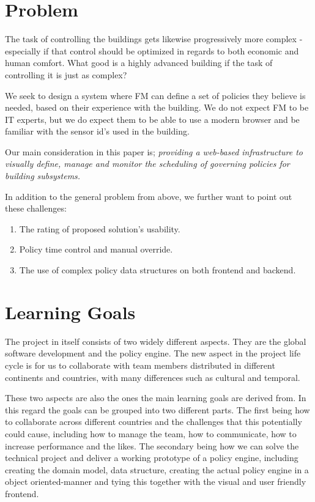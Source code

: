 \section{Problem} \label{sec:problem}
The task of controlling the buildings gets likewise progressively more complex - especially if that control should be optimized in regards to both economic and human comfort. What good is a highly advanced building if the task of controlling it is just as complex?

We seek to design a system where FM can define a set of policies they believe is needed, based on their experience with the building. We do not expect FM to be IT experts, but we do expect them to be able to use a modern browser and be familiar with the sensor id's used in the building.

Our main consideration in this paper is; \textit{providing a web-based infrastructure to visually define, manage and monitor the scheduling of governing policies for building subsystems.}

In addition to the general problem from above, we further want to point out these challenges:
\begin{enumerate}
	\item The rating of proposed solution's usability.
	\item Policy time control and manual override.
	\item The use of complex policy data structures on both frontend and backend.
\end{enumerate}

\section{Learning Goals} \label{sec:learninggoals}
The project in itself consists of two widely different aspects. They are the global software development and the policy engine. The new aspect in the project life cycle is for us to collaborate with team members distributed in different continents and countries, with many differences such as cultural and temporal.

These two aspects are also the ones the main learning goals are derived from. In this regard the goals can be grouped into two different parts. The first being how to collaborate across different countries and the challenges that this potentially could cause, including how to manage the team, how to communicate, how to increase performance and the likes. The secondary being how we can solve the technical project and deliver a working prototype of a policy engine, including creating the domain model, data structure, creating the actual policy engine in a object oriented-manner and tying this together with the visual and user friendly frontend.

